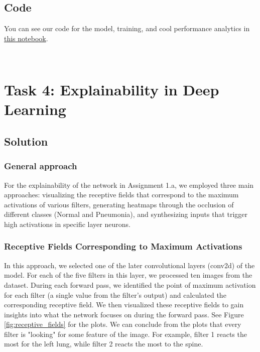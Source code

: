 \documentclass{article}
\begin{document}
\subsection{Code}

You can see our code for the model, training, and cool performance analytics in \href{https://www.kaggle.com/code/nitsanbenhanoch/lungs-x-ray-anomaly-detection}{this notebook}.


\
\section{Task 4: Explainability in Deep Learning}

\subsection{Solution}
\subsubsection{General approach}
For the explainability of the network in Assignment 1.a, we employed three main approaches: visualizing the receptive fields that correspond to the maximum activations of various filters, generating heatmaps through the occlusion of different classes (Normal and Pneumonia), and synthesizing inputs that trigger high activations in specific layer neurons.

\subsubsection{Receptive Fields Corresponding to Maximum Activations}
In this approach, we selected one of the later convolutional layers (conv2d) of the model. For each of the five filters in this layer, we processed ten images from the dataset. During each forward pass, we identified the point of maximum activation for each filter (a single value from the filter's output) and calculated the corresponding receptive field. We then visualized these receptive fields to gain insights into what the network focuses on during the forward pass. See Figure \ref{fig:receptive_fields} for the plots. We can conclude from the plots that every filter is "looking" for some feature of the image. For example, filter 1 reacts the most for the left lung, while filter 2 reacts the most to the spine.
\end{document}
